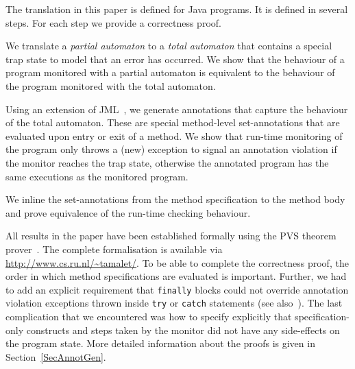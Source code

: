 The translation in this paper is defined for Java programs. It is
defined in several steps. For each step we provide a correctness
proof.
\begin{inparaenum}
\item We translate a \emph{partial automaton} to a \emph{total automaton}
that contains a special trap state to model that an error has
occurred.
We show that the behaviour of a program monitored with a partial
automaton is equivalent to the behaviour of the program monitored with
the total automaton.
\item Using an extension of JML~\cite{LeavensPCCRCK05}, we generate annotations
that capture the behaviour of the total automaton. These are special
method-level set-annotations that are evaluated upon entry or exit of
a method.  We show that run-time monitoring of the program only throws
a (new) exception to signal an annotation violation if the monitor
reaches the trap state, otherwise the annotated program has the same
executions as the monitored program.
\item We inline the set-annotations from the method specification
to the method body and prove equivalence of the run-time checking behaviour.
\end{inparaenum}
All results in the paper have been established formally using
the PVS theorem prover~\cite{OwreRRSS96}. The complete formalisation
is available via \url{http://www.cs.ru.nl/~tamalet/}. To be able to
complete the correctness proof, the order in which method
specifications are evaluated is important. Further, we had to add an
explicit requirement that \texttt{finally} blocks could not override
annotation violation exceptions thrown inside \texttt{try} or
\texttt{catch} statements (see also~\cite{Huisman08}). The last
complication that we encountered was how to specify explicitly that
specification-only constructs and steps taken by the monitor did not
have any side-effects on the program state. More detailed information
about the proofs is given in Section~\ref{SecAnnotGen}.

